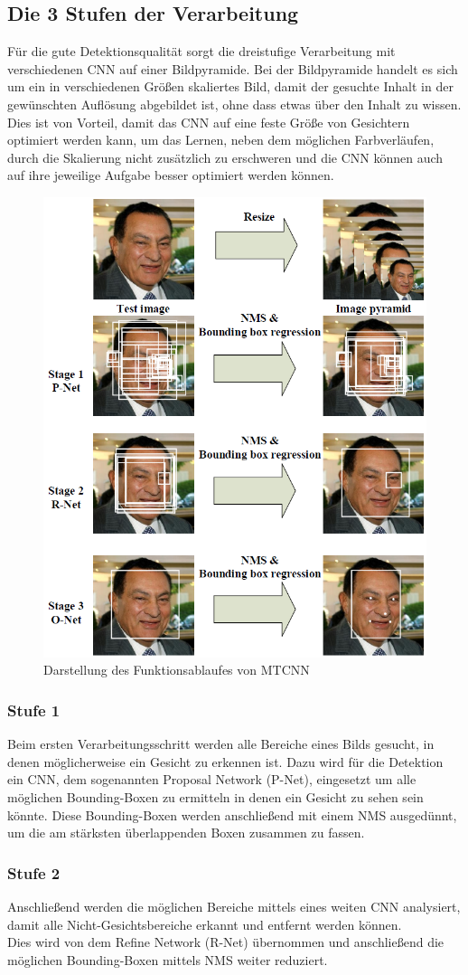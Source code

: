\subsection{Die 3 Stufen der Verarbeitung}
Für die gute Detektionsqualität sorgt die dreistufige Verarbeitung mit verschiedenen CNN auf einer Bildpyramide. Bei der Bildpyramide handelt es sich um ein in verschiedenen Größen skaliertes Bild, damit der gesuchte Inhalt in der gewünschten Auflösung abgebildet ist, ohne dass etwas über den Inhalt zu wissen.\\
Dies ist von Vorteil, damit das CNN auf eine feste Größe von Gesichtern optimiert werden kann, um das Lernen, neben dem möglichen Farbverläufen, durch die Skalierung nicht zusätzlich zu erschweren und die CNN können auch auf ihre jeweilige Aufgabe besser optimiert werden können.
\begin{figure}
	\centering
	\includegraphics[width=0.5\linewidth]{img/MTCNN_Step}
	\caption{Darstellung des Funktionsablaufes von MTCNN\cite{MTCCN}}
	\label{img_MTCNN_Step}
\end{figure}
\subsubsection{Stufe 1}
Beim ersten Verarbeitungsschritt werden alle Bereiche eines Bilds gesucht, in denen möglicherweise ein Gesicht zu erkennen ist. Dazu wird für die Detektion ein CNN, dem sogenannten Proposal Network (P-Net), eingesetzt um alle möglichen Bounding-Boxen zu ermitteln in denen ein Gesicht zu sehen sein könnte. Diese Bounding-Boxen werden anschließend mit einem NMS ausgedünnt, um die am stärksten überlappenden Boxen zusammen zu fassen.
\subsubsection{Stufe 2}
Anschließend werden die möglichen Bereiche mittels eines weiten CNN analysiert, damit alle Nicht-Gesichtsbereiche erkannt und entfernt werden können.\\
Dies wird von dem Refine Network (R-Net) übernommen und anschließend die möglichen Bounding-Boxen mittels NMS weiter reduziert.
